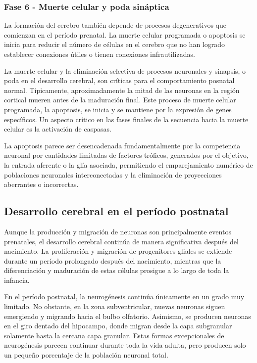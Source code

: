 \documentclass[11pt,letterpaper]{report}
\begin{document}
\subsubsection{Fase 6 - Muerte celular y poda sináptica}
La formación del cerebro también depende de procesos degenerativos que
comienzan en el período prenatal. La muerte celular programada o apoptosis se
inicia para reducir el número de células en el cerebro que no han logrado
establecer conexiones útiles o tienen conexiones infrautilizadas.
\cite{Gibb2018}

La muerte celular y la eliminación selectiva de procesos neuronales y sinapsis,
o poda en el desarrollo cerebral, son críticas para el comportamiento posnatal
normal. Típicamente, aproximadamente la mitad de las neuronas en la región
cortical mueren antes de la maduración final. Este proceso de muerte celular
programada, la apoptosis, se inicia y se mantiene por la expresión de genes
específicos. Un aspecto crítico en las fases finales de la secuencia hacia la
muerte celular es la activación de caspasas. \cite{Polin124}

La apoptosis parece ser desencadenada fundamentalmente por la competencia
neuronal por cantidades limitadas de factores tróficos, generados por el
objetivo, la entrada aferente o la glía asociada, permitiendo el emparejamiento
numérico de poblaciones neuronales interconectadas y la eliminación de
proyecciones aberrantes o incorrectas. \cite{Polin124}

\subsection{Desarrollo cerebral en el período postnatal}
Aunque la producción y migración de neuronas son principalmente eventos
prenatales, el desarrollo cerebral continúa de manera significativa después del
nacimiento. La proliferación y migración de progenitores gliales se extiende
durante un período prolongado después del nacimiento, mientras que la
diferenciación y maduración de estas células prosigue a lo largo de toda la
infancia. \cite{Stiles2010}

En el período postnatal, la neurogénesis continúa únicamente en un grado muy
limitado. No obstante, en la zona subventricular, nuevas neuronas siguen
emergiendo y migrando hacia el bulbo olfatorio. Asimismo, se producen neuronas
en el giro dentado del hipocampo, donde migran desde la capa subgranular
solamente hasta la cercana capa granular. Estas formas excepcionales de
neurogénesis parecen continuar durante toda la vida adulta, pero producen solo
un pequeño porcentaje de la población neuronal total.
\cite{Stiles2010}
\end{document}
